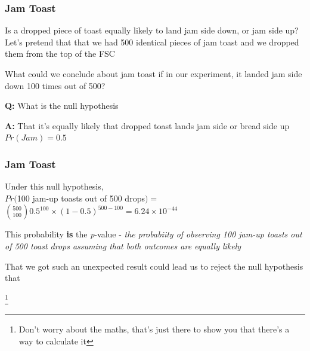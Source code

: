 \documentclass[xcolor=dvipsnames]{beamer}
\newcommand\blfootnote[1]{%
	\begingroup
	\renewcommand\thefootnote{}\footnote{#1}%
	\addtocounter{footnote}{-1}%
	\endgroup
}
\begin{document}
\begin{frame}
\frametitle{Jam Toast}
Is a dropped piece of toast equally likely to land jam side down, or jam side up?\\ 

\vspace{10pt}
Let's pretend that that we had 500 identical pieces of jam toast and we dropped them from the top of the FSC\\

\vspace{10pt}

What could we conclude about jam toast if in our experiment, it landed jam side down 100 times out of 500?\\ \pause

\vspace{10pt}

\textbf{Q:} What is the null hypothesis\\ \pause

\textbf{A:} That it's equally likely that dropped toast lands jam side or bread side up $Pr(Jam)=0.5$\\

	
	
	
\end{frame}






\begin{frame}
	\frametitle{Jam Toast}
	
Under this null hypothesis,\\
$Pr($100 jam-up toasts out of 500 drops$) =$\\
$ \binom{500}{100}0.5^{100}\times(1-0.5)^{500-100}  = 6.24 \times 10^{-44}$
	


\vspace{20pt}
This probability \textbf{is} the \textit{p}-value - \textit{the probabiity of observing 100 jam-up toasts out of 500 toast drops assuming that both outcomes are equally likely} \\
\pause
	
\vspace{10pt}
	
That we got such an unexpected result could lead us to reject the null hypothesis that 
	
	\blfootnote{Don't worry about the maths, that's just there to show you that there's a way to calculate it}
	
\end{frame}
\end{document}
